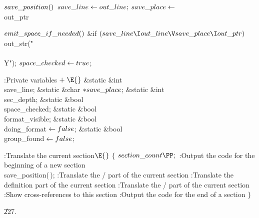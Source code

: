 \Y\B\4\D$\\{save\_position}()$ \5
$\\{save\_line}\leftarrow\\{out\_line};$ $\\{save\_place}\leftarrow{}$\\{out\_ptr}\par
\B\4\D$\\{emit\_space\_if\_needed}()$ \6
\&{if} ${}(\\{save\_line}\I\\{out\_line}\V\\{save\_place}\I\\{out\_ptr}){}$\1\5
\\{out\_str}(\.{"\\\\Y"});\2\6
${}\\{space\_checked}\leftarrow\\{true}{}$;\par
\Y\B\4:Private variables\X${}\mathrel+\E{}$\6
\&{static} \&{int} \\{save\_line};\6
\&{static} \&{char} ${}{*}\\{save\_place}{}$;\6
\&{static} \&{int} \\{sec\_depth};\6
\&{static} \&{bool} \\{space\_checked};\6
\&{static} \&{bool} \\{format\_visible};\6
\&{static} \&{bool} \\{doing\_format}${}\leftarrow\\{false}{}$;\6
\&{static} \&{bool} \\{group\_found}${}\leftarrow\\{false}{}$;\par
\fi

\B{}:Translate the current section\X${}\E{}$\6
${}\{{}$\1\6
${}\\{section\_count}\PP;{}$\6
:Output the code for the beginning of a new section\X\6
\\{save\_position}(\,);\6
:Translate the \TEX/ part of the current section\X\6
:Translate the definition part of the current section\X\6
:Translate the \CEE/ part of the current section\X\6
:Show cross-references to this section\X\6
:Output the code for the end of a section\X\6
\4${}\}{}$\2\par
\U227.\fi

